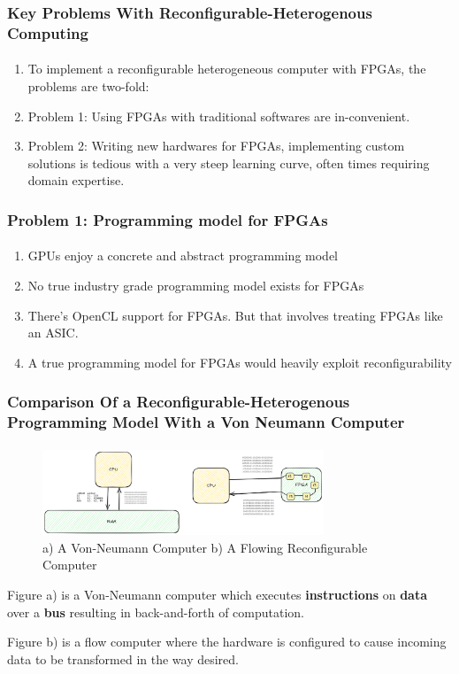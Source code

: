 \documentclass{beamer}
\begin{document}
\begin{frame}[fragile]
\frametitle{Key Problems With Reconfigurable-Heterogenous Computing}
\framesubtitle{}
  \begin{enumerate}
    \item To implement a reconfigurable heterogeneous computer with FPGAs,
      the problems are two-fold:
    \item Problem 1: Using FPGAs with traditional softwares are in-convenient.
    \item Problem 2: Writing new hardwares for FPGAs, implementing custom solutions is
      tedious with a very steep learning curve, often times requiring 
      domain expertise.
  \end{enumerate}
\end{frame}

\begin{frame}[fragile]
\frametitle{Problem 1: Programming model for FPGAs}
\framesubtitle{}
  \begin{enumerate}
    \item GPUs enjoy a concrete and abstract programming model
    \item No true industry grade programming model exists for FPGAs
    \item There's OpenCL support for FPGAs. But that involves treating
      FPGAs like an ASIC.
    \item A true programming model for FPGAs would heavily exploit
      reconfigurability
  \end{enumerate}
\end{frame}

\begin{frame}[fragile]
  \frametitle{Comparison Of a Reconfigurable-Heterogenous Programming Model With a Von Neumann
  Computer}
  \framesubtitle{}
  \begin{figure}
    \centering
    \includegraphics[width=0.75\textwidth]{flow.png}
    \caption{a) A Von-Neumann Computer b) A Flowing Reconfigurable Computer}
    \label{}
  \end{figure}
  Figure a) is a Von-Neumann computer which executes
  \textbf{instructions} on \textbf{data} over a \textbf{bus} resulting in
  back-and-forth of computation. 

  Figure b) is a flow computer where the
  hardware is configured to cause incoming data to be transformed in the
  way desired. 
\end{frame}
\end{document}
